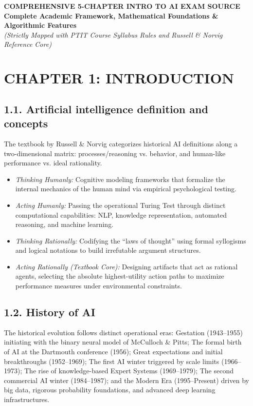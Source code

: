 \documentclass[../main.tex]{subfiles}
\begin{document}

\begin{center}
    \textbf{\LARGE COMPREHENSIVE 5-CHAPTER INTRO TO AI EXAM SOURCE} \\
    \vspace{0.2cm}
    \textbf{\LARGE Complete Academic Framework, Mathematical Foundations \& Algorithmic Features} \\
    \textit{(Strictly Mapped with PTIT Course Syllabus Rules and Russell \& Norvig Reference Core)}
\end{center}

\vspace{0.5cm}

\section{CHAPTER 1: INTRODUCTION}

\subsection{1.1. Artificial intelligence definition and concepts}
The textbook by Russell \& Norvig categorizes historical AI definitions along a two-dimensional matrix: processes/reasoning vs. behavior, and human-like performance vs. ideal rationality.
\begin{itemize}
    \item \textit{Thinking Humanly:} Cognitive modeling frameworks that formalize the internal mechanics of the human mind via empirical psychological testing.
    \item \textit{Acting Humanly:} Passing the operational Turing Test through distinct computational capabilities: NLP, knowledge representation, automated reasoning, and machine learning.
    \item \textit{Thinking Rationally:} Codifying the ``laws of thought'' using formal syllogisms and logical notations to build irrefutable argument structures.
    \item \textit{Acting Rationally (Textbook Core):} Designing artifacts that act as rational agents, selecting the absolute highest-utility action paths to maximize performance measures under environmental constraints.
\end{itemize}

\subsection{1.2. History of AI}
The historical evolution follows distinct operational eras: Gestation (1943--1955) initiating with the binary neural model of McCulloch \& Pitts; The formal birth of AI at the Dartmouth conference (1956); Great expectations and initial breakthroughs (1952--1969); The first AI winter triggered by scale limits (1966--1973); The rise of knowledge-based Expert Systems (1969--1979); The second commercial AI winter (1984--1987); and the Modern Era (1995--Present) driven by big data, rigorous probability foundations, and advanced deep learning infrastructures.
\end{document}
